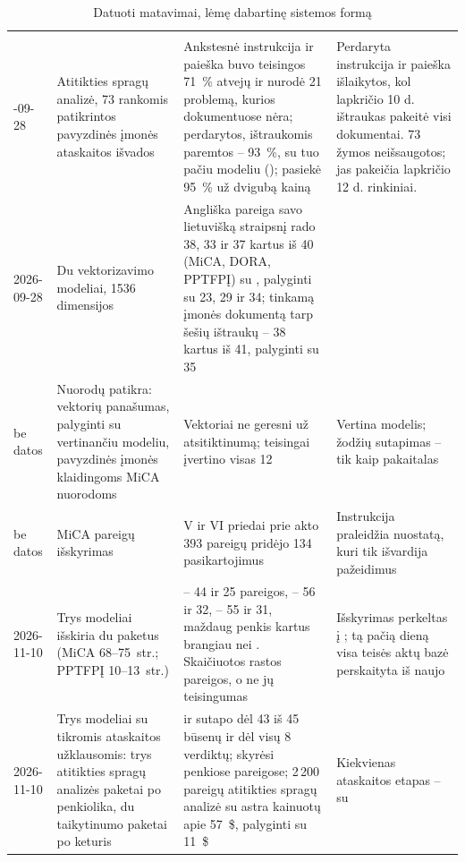 \begin{xltabular}{\textwidth}{@{}L{17mm}L{37mm}YL{37mm}@{}}
\caption{Datuoti matavimai, lėmę dabartinę sistemos formą}\label{tab:control:record}\\
\toprule
{} &  &  &  \\
\midrule
\endfirsthead
\toprule
{} &  &  &  \\
\midrule
\endhead
\bottomrule
{}-09-28 & Atitikties spragų analizė, 73 rankomis patikrintos pavyzdinės įmonės ataskaitos išvados & Ankstesnė instrukcija ir paieška buvo teisingos 71~\% atvejų ir nurodė 21 problemą, kurios dokumentuose nėra; perdarytos, ištraukomis paremtos -- 93~\%, su tuo pačiu modeliu ();  pasiekė 95~\% už dvigubą kainą & Perdaryta instrukcija ir paieška išlaikytos, kol lapkričio 10 d. ištraukas pakeitė visi dokumentai. 73 žymos neišsaugotos; jas pakeičia lapkričio 12 d. rinkiniai. \\
2026-09-28 & Du vektorizavimo modeliai, 1536 dimensijos & Angliška pareiga savo lietuvišką straipsnį rado 38, 33 ir 37 kartus iš 40 (MiCA, DORA, PPTFPĮ) su , palyginti su 23, 29 ir 34; tinkamą įmonės dokumentą tarp šešių ištraukų -- 38 kartus iš 41, palyginti su 35 &  \\
be datos & Nuorodų patikra: vektorių panašumas, palyginti su vertinančiu modeliu, pavyzdinės įmonės klaidingoms MiCA nuorodoms & Vektoriai ne geresni už atsitiktinumą;  teisingai įvertino visas 12 & Vertina modelis; žodžių sutapimas -- tik kaip pakaitalas \\
be datos & MiCA pareigų išskyrimas & V ir VI priedai prie akto 393 pareigų pridėjo 134 pasikartojimus & Instrukcija praleidžia nuostatą, kuri tik išvardija pažeidimus \\
2026-11-10 & Trys modeliai išskiria du paketus (MiCA 68--75~str.; PPTFPĮ 10--13~str.) &  -- 44 ir 25 pareigos,  -- 56 ir 32,  -- 55 ir 31, maždaug penkis kartus brangiau nei . Skaičiuotos rastos pareigos, o ne jų teisingumas & Išskyrimas perkeltas į ; tą pačią dieną visa teisės aktų bazė perskaityta iš naujo \\
2026-11-10 & Trys modeliai su tikromis ataskaitos užklausomis: trys atitikties spragų analizės paketai po penkiolika, du taikytinumo paketai po keturis &  ir  sutapo dėl 43 iš 45 būsenų ir dėl visų 8 verdiktų;  skyrėsi penkiose pareigose; 2\,200 pareigų atitikties spragų analizė su astra kainuotų apie 57~\$, palyginti su 11~\$ & Kiekvienas ataskaitos etapas -- su  \\

\end{xltabular}
